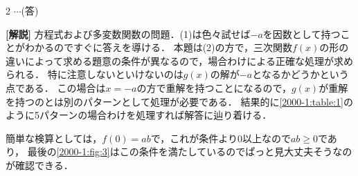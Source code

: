 \documentclass[../../main.tex]{subfiles}
\begin{document}
\begin{multicols}{2}
  $\cdots$(答)

  {\bf [解説]}
  方程式および多変数関数の問題．(1)は色々試せば$-a$を因数として持つことがわかるのですぐに答えを導ける．
  本題は(2)の方で，三次関数$f(x)$の形の違いによって求める題意の条件が異なるので，場合わけによる正確な処理が求められる．
  特に注意しないといけないのは$g(x)$の解が$-a$となるかどうかという点である．
  この場合は$x=-a$の方で重解を持つことになるので，$g(x)$が重解を持つのとは別のパターンとして処理が必要である．
  結果的に\cref{2000-1:table:1}のように5パターンの場合わけを処理すれば解答に辿り着ける．

  簡単な検算としては，$f(0)=ab$で，これが条件より$0$以上なので$ab\ge 0$であり，
  最後の\cref{2000-1:fig:3}はこの条件を満たしているのでぱっと見大丈夫そうなのが確認できる．

  \newpage
\end{multicols}
\end{document}
